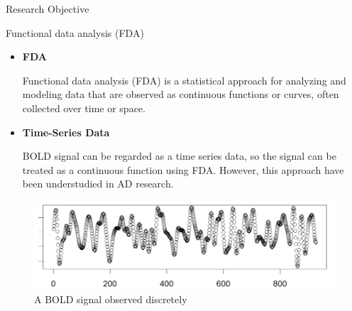 \documentclass[final]{beamer}
\newlength{\colwidth}
\begin{document}
\begin{frame}[t]
\begin{columns}[t]
\begin{column}{\colwidth}
  






  
\begin{block}{Research Objective}
    \begin{exampleblock}{Functional data analysis (FDA)}

    \begin{itemize}
      \item \textbf{FDA}

        Functional data analysis (FDA) is a statistical approach for analyzing and modeling data that are observed as continuous functions or curves, often collected over time or space.

        \item \textbf{Time-Series Data}
      
        BOLD signal can be regarded as a time series data, so the signal can be treated as a continuous function using FDA. However, this approach have been understudied in AD research.
      
    \end{itemize}

\end{exampleblock}




    \begin{figure}[ht]
    \centering
    \includegraphics[width=\textwidth]{images/BOLD.png}
    \caption{A BOLD signal observed discretely}
    \label{fig:example}
\end{figure}

  \end{block}



\end{column}
\end{columns}
\end{frame}
\end{document}

